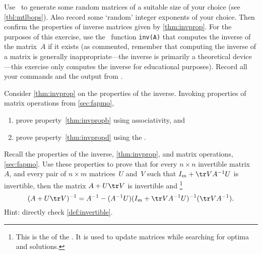 \begin{exercise}  
Use \script\ to generate some random matrices of a suitable size of your choice (see \cref{tbl:mtlbops}). 
Also record some `random' integer exponents of your choice.
Then confirm the properties of inverse matrices given by \cref{thm:invprop}.
For the purposes of this exercise, use the \script\ function \verb|inv(A)| that computes the inverse of the matrix~\(A\) if it exists (as commented, remember that computing the inverse of a matrix is generally inappropriate---the inverse is primarily a  theoretical device---this exercise only computes the inverse for educational purposes).
Record all your commands and the output from \script.
\end{exercise}







\begin{exercise}  
Consider \cref{thm:invprop} on the properties of the inverse. Invoking properties of matrix operations from \cref{sec:fapmo},
\begin{enumerate}
\item prove property~\ref{thm:invpropb} using associativity, and
\item prove property~\ref{thm:invpropd} using the .
\end{enumerate}
\end{exercise}



\begin{exercise}  
Recall the properties of the inverse, \cref{thm:invprop}, and matrix operations, \cref{sec:fapmo}.
Use these properties to prove that for every \(n\times n\) invertible matrix~\(A\), and every pair of \(n\times m\) matrices~\(U\) and~\(V\) such that \(I_m+\tr VA^{-1}U\) is invertible, then the matrix \(A+U\tr V\) is invertible and%
\footnote{This is the  of the .  
It is used to update matrices while searching for optima and solutions.}
\begin{equation*}
(A+U\tr V)^{-1}=A^{-1}-(A^{-1}U)(I_m+\tr VA^{-1}U)^{-1}(\tr VA^{-1}).
\end{equation*}
Hint: directly check \cref{def:invertible}.
\end{exercise}





